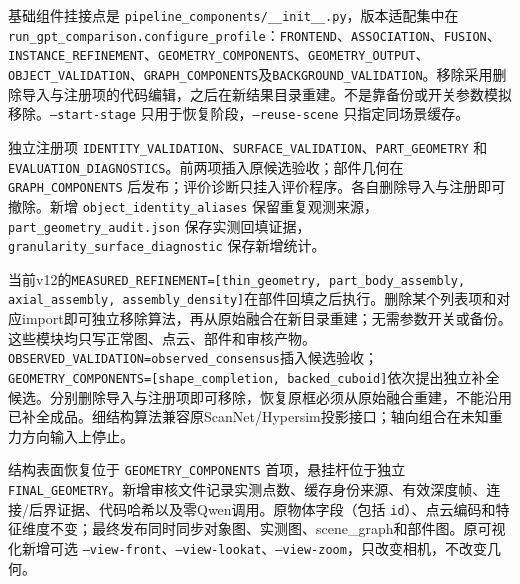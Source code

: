 \documentclass[UTF8,fontset=fandol]{ctexart}
\begin{document}
基础组件挂接点是 \texttt{pipeline\_\allowbreak{}components/\allowbreak{}\_\allowbreak{}\_\allowbreak{}init\_\allowbreak{}\_\allowbreak{}.\allowbreak{}py}，版本适配集中在 \texttt{run\_\allowbreak{}gpt\_\allowbreak{}comparison.\allowbreak{}configure\_\allowbreak{}profile}：\texttt{FRONTEND}、\texttt{ASSOCIATION}、\texttt{FUSION}、\texttt{INSTANCE\_\allowbreak{}REFINEMENT}、\texttt{GEOMETRY\_\allowbreak{}COMPONENTS}、\texttt{GEOMETRY\_\allowbreak{}OUTPUT}、\texttt{OBJECT\_\allowbreak{}VALIDATION}、\texttt{GRAPH\_\allowbreak{}COMPONENTS}及\texttt{BACKGROUND\_\allowbreak{}VALIDATION}。移除采用删除导入与注册项的代码编辑，之后在新结果目录重建。不是靠备份或开关参数模拟移除。\texttt{--start-stage} 只用于恢复阶段，\texttt{--reuse-scene} 只指定同场景缓存。



独立注册项 \texttt{IDENTITY\_\allowbreak{}VALIDATION}、\texttt{SURFACE\_\allowbreak{}VALIDATION}、\texttt{PART\_\allowbreak{}GEOMETRY} 和 \texttt{EVALUATION\_\allowbreak{}DIAGNOSTICS}。前两项插入原候选验收；部件几何在 \texttt{GRAPH\_\allowbreak{}COMPONENTS} 后发布；评价诊断只挂入评价程序。各自删除导入与注册即可撤除。新增 \texttt{object\_\allowbreak{}identity\_\allowbreak{}aliases} 保留重复观测来源，\texttt{part\_\allowbreak{}geometry\_\allowbreak{}audit.\allowbreak{}json} 保存实测回填证据，\texttt{granularity\_\allowbreak{}surface\_\allowbreak{}diagnostic} 保存新增统计。



当前v12的\texttt{MEASURED\_\allowbreak{}REFINEMENT=[thin\_\allowbreak{}geometry, part\_\allowbreak{}body\_\allowbreak{}assembly, axial\_\allowbreak{}assembly, assembly\_\allowbreak{}density]}在部件回填之后执行。删除某个列表项和对应import即可独立移除算法，再从原始融合在新目录重建；无需参数开关或备份。这些模块均只写正常图、点云、部件和审核产物。\texttt{OBSERVED\_\allowbreak{}VALIDATION=observed\_\allowbreak{}consensus}插入候选验收；\texttt{GEOMETRY\_\allowbreak{}COMPONENTS=[shape\_\allowbreak{}completion, backed\_\allowbreak{}cuboid]}依次提出独立补全候选。分别删除导入与注册项即可移除，恢复原框必须从原始融合重建，不能沿用已补全成品。细结构算法兼容原ScanNet/Hypersim投影接口；轴向组合在未知重力方向输入上停止。



结构表面恢复位于 \texttt{GEOMETRY\_\allowbreak{}COMPONENTS} 首项，悬挂杆位于独立 \texttt{FINAL\_\allowbreak{}GEOMETRY}。新增审核文件记录实测点数、缓存身份来源、有效深度帧、连接/后界证据、代码哈希以及零Qwen调用。原物体字段（包括 \texttt{id}）、点云编码和特征维度不变；最终发布同时同步对象图、实测图、scene\_graph和部件图。原可视化新增可选 \texttt{--view-front}、\texttt{--view-lookat}、\texttt{--view-zoom}，只改变相机，不改变几何。
\end{document}
